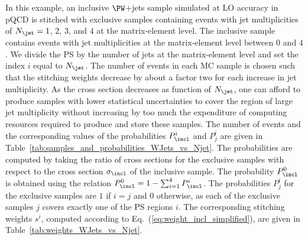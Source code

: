 In this example, an inclusive $\PW$+jets sample simulated at LO accuracy in pQCD 
is stitched with exclusive samples containing events with jet multiplicities of $N_{\jet} = 1$, $2$, $3$, and $4$ at the matrix-element level.
The inclusive sample contains events with jet multiplicities at the matrix-element level between $0$ and $4$.
We divide the PS by the number of jets at the matrix-element level and set the index $i$ equal to $N_{\jet}$.
The number of events in each MC sample is chosen such that the stitching weights decrease by about a factor two for each increase in jet multiplicity.
As the cross section decreases as function of $N_{\jet}$,
one can afford to produce samples with lower statistical uncertainties to cover the region of large jet multiplicity
without increasing by too much the expenditure of computing resources required to produce and store these samples.
The number of events and the corresponding values of the probabilities $P_{\incl}^{i}$ and $P_{j}^{i}$ are given in Table~\ref{tab:samples_and_probabilities_WJets_vs_Njet}.
The probabilities are computed by taking the ratio of cross sections 
for the exclusive samples with respect to the cross section $\sigma_{\incl}$ of the inclusive sample.
The probability $P_{\incl}^{0}$ is obtained using the relation $P_{\incl}^{0} = 1 - \sum_{i=1}^{4} P_{\incl}^{i}$.
The probabilities $P_{j}^{i}$ for the exclusive samples are $1$ if $i=j$ and $0$ otherwise,
as each of the exclusive samples $j$ covers exactly one of the PS regions $i$.
The corresponding stitching weights $s^{i}$, computed according to Eq.~(\ref{eq:weight_incl_simplified}), are given in Table~\ref{tab:weights_WJets_vs_Njet}.

